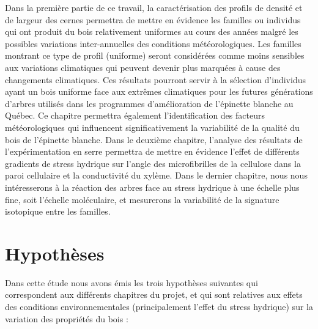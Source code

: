 \documentclass[a4paper,12pt]{report}
\begin{document}
   
Dans la première partie de ce travail, la caractérisation des profils de densité et de largeur des cernes permettra de mettre en évidence les familles ou individus qui ont produit du bois relativement \og uniformes \fg au cours des années malgré les possibles variations inter-annuelles des conditions météorologiques. Les familles montrant ce type de profil (uniforme) seront considérées comme moins sensibles aux variations climatiques qui peuvent devenir plus marquées à cause des changements climatiques. Ces résultats pourront servir à la sélection d'individus ayant un bois uniforme face aux extrêmes climatiques pour les futures générations d'arbres utilisés dans les programmes d'amélioration de l'épinette blanche au Québec. Ce chapitre permettra également l'identification des facteurs météorologiques qui influencent significativement la variabilité de la qualité du bois de l'épinette blanche. Dans le deuxième chapitre, l'analyse des résultats de l'expérimentation en serre permettra de mettre en évidence l'effet de différents gradients de stress hydrique sur l'angle des microfibrilles de la cellulose dans la paroi cellulaire et la conductivité du xylème. Dans le dernier chapitre, nous nous intéresserons à la réaction des arbres face au stress hydrique à une échelle plus fine, soit l'échelle moléculaire, et mesurerons la variabilité de la signature isotopique entre les familles. \\


\section{Hypothèses}

Dans cette étude nous avons émis les trois hypothèses suivantes qui correspondent aux différents chapitres du projet, et qui sont relatives aux effets des conditions environnementales (principalement l'effet du stress hydrique) sur la variation des propriétés du bois :\\
\end{document}
